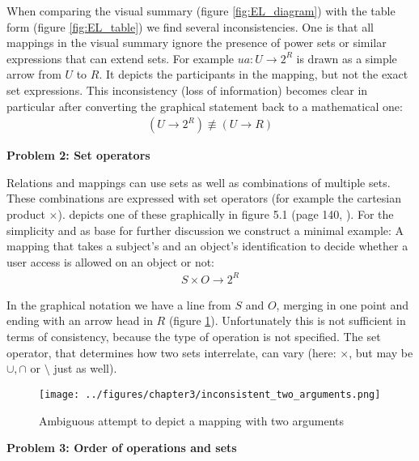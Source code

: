 \documentclass[twoside, openright, 12pt]{book}
\begin{document}
\noindent
When comparing the visual summary (figure \ref{fig:EL_diagram}) with the table form (figure \ref{fig:EL_table}) we find several inconsistencies.
One is that all mappings in the visual summary ignore the presence of power sets or similar expressions that can extend sets.
For example $ua: U \rightarrow 2^R$ is drawn as a simple arrow from $U$ to $R$.
It depicts the participants in the mapping, but not the exact set expressions.
This inconsistency (loss of information) becomes clear in particular after converting the graphical statement back to a mathematical one:
\begin{align}
(U \rightarrow 2^R) \not\equiv (U \rightarrow R)
\end{align}



\vspace{4mm}
\noindent
\textbf{Problem 2: Set operators}
\vspace{1mm}

\noindent
Relations and mappings can use sets as well as combinations of multiple sets.
These combinations are expressed with set operators (for example the cartesian product $\times$).
\cite{Amthor18} depicts one of these graphically in figure 5.1 (page 140, \citep{Amthor18}).
For the simplicity and as base for further discussion we construct a minimal example: A mapping that takes a subject's and an object's identification to decide whether a user access is allowed on an object or not:
\begin{align}
S \times O \rightarrow 2^R
\end{align}

\noindent
In the graphical notation we have a line from $S$ and $O$, merging in one point and ending with an arrow head in $R$ (figure \ref{fig:inconsistent_two_arguments}).
Unfortunately this is not sufficient in terms of consistency, because the type of operation is not specified.
The set operator, that determines how two sets interrelate, can vary (here: $\times$, but may be $\cup, \cap$ or $\setminus$ just as well).

\begin{figure}[htb]
	\centering
	\texttt{[image: ../figures/chapter3/inconsistent\_two\_arguments.png]}
	\caption{Ambiguous attempt to depict a mapping with two arguments}
	\label{fig:inconsistent_two_arguments}
\end{figure}



\vspace{4mm}
\noindent
\textbf{Problem 3: Order of operations and sets}
\vspace{1mm}
\end{document}
